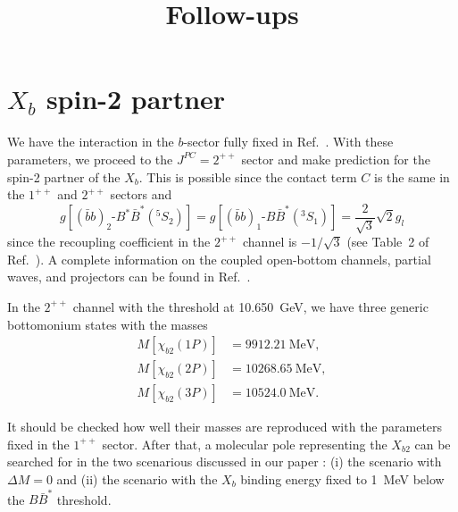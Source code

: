 \documentclass[aps,prl,showpacs,amsmath,onecolumn,superscriptaddress,floatfix,nofootinbib,notitlepage]{revtex4-2}
\newcommand{\be}{\begin{equation}}
\newcommand{\ee}{\end{equation}}
\newcommand{\Xb}{X_b}
\newcommand{\fzj}{\affiliation{Institute for Advanced Simulation
and Cluster of Excellence ``Color meets Flavor'', Forschungszentrum J\"ulich, D-52425 J\"ulich, Germany}}
\newcommand{\itp}{\affiliation{Institute of Theoretical Physics, Chinese Academy of Sciences, Beijing 100190, China}}
\newcommand{\ucas}{\affiliation{School of Physical Sciences, University of Chinese Academy of Sciences, Beijing 100049, China}}
\newcommand{\scnt}{\affiliation{Southern Center for Nuclear-Science Theory (SCNT), Institute of Modern Physics,\\ Chinese Academy of Sciences, Huizhou 516000, China}}
\newcommand{\hiskp}{\affiliation{Helmholtz-Institut f\"ur Strahlen- und Kernphysik%
, Universit\"at Bonn, 53115 Bonn, Germany}}
\begin{document}
\title{Follow-ups}


%
%

\maketitle

\tableofcontents

\section{$\Xb$ spin-2 partner}

We have the interaction in the $b$-sector fully fixed in Ref.~\cite{Zhang:2026iyr}. With these parameters, we proceed to the $J^{PC}=2^{++}$ sector and make prediction for the spin-2 partner of the $\Xb$. This is possible since the contact term $C$ is the same in the $1^{++}$ and $2^{++}$ sectors and \cite{Bulava:2024jpj}
\be
g[(\bar{b}b)_2\mbox{-}B^*\bar{B}^*(^5S_2)]=
g[(\bar{b}b)_1\mbox{-}B\bar{B}^*(^3S_1)]=\frac{2}{\sqrt{3}}\sqrt{2}g_l
\ee
since the recoupling coefficient in the $2^{++}$ channel is  $-1/\sqrt{3}$ (see Table~2 of Ref.~\cite{Bruschini:2023zkb}).
A complete information on the coupled open-bottom channels, partial waves, and projectors can be found in Ref.~\cite{Baru:2019xnh}.

In the $2^{++}$ channel with the threshold at 10.650~GeV, we have three generic bottomonium states with the masses
\be
\begin{split}
	M[\chi_{b2}(1P)] & =9912.21~\mbox{MeV},  \\
	M[\chi_{b2}(2P)] & =10268.65~\mbox{MeV}, \\
	M[\chi_{b2}(3P)] & =10524.0~\mbox{MeV}.
\end{split}
\ee

It should be checked how well their masses are reproduced with the parameters fixed in the $1^{++}$ sector. After that, a molecular pole representing the $X_{b2}$ can be searched for in the two scenarious discussed in our paper \cite{Zhang:2026iyr}:
(i) the scenario with $\Delta M=0$ and (ii) the scenario with the $\Xb$ binding energy fixed to 1~MeV below the $B\bar{B}^*$ threshold.
\end{document}
